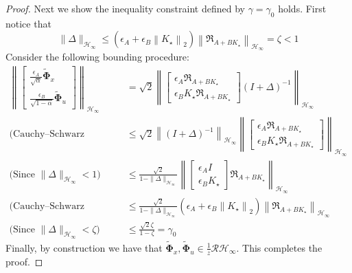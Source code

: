 \documentclass{article}[12pt]
\begin{document}
\begin{proof}
Next we show the inequality constraint defined by $\gamma = \gamma_0$ holds. First notice that
\begin{equation}
\label{pf::delta}
    \|\Delta\|_{\mathcal{H}_{\infty}} \leq\left(\epsilon_{A}+\epsilon_{B}\left\|K_{\star}\right\|_{2}\right)\left\|\mathfrak{R}_{A+B K_{\star}}\right\|_{\mathcal{H}_{\infty}}=\zeta<1
\end{equation}
Consider the following bounding procedure:
\begin{equation}
\begin{aligned}
    \left\|\left[\begin{array}{c}{\frac{\epsilon_{A}}{\sqrt{\alpha}} \tilde{\mathbf{\Phi}}_{x}} \\ {\frac{\epsilon_{B}}{\sqrt{1-\alpha}} \tilde{\mathbf{\Phi}}_{u}}\end{array}\right]\right\|_{\mathcal{H}_{\infty}} &= \sqrt{2}\left\|\left[\begin{array}{c}{\epsilon_{A} \Re_{A+B K_{\star}}} \\ {\epsilon_{B} K_{\star} \Re_{A+B K_{\star}}}\end{array}\right](I+\Delta)^{-1}\right\|_{\mathcal{H}_{\infty}} \\
    \text{(Cauchy–Schwarz Inequality)} \quad
    &\leq \sqrt{2}\left\|(I+\Delta)^{-1}\right\|_{\mathcal{H}_{\infty}}\left\|\left[\begin{array}{c}{\epsilon_{A} \Re_{A+B K_{\star}}} \\ {\epsilon_{B} K_{\star} \Re_{A+B K_{\star}}}\end{array}\right]\right\|_{\mathcal{H}_{\infty}} \\
    \text{(Since $\|\Delta\|_{\mathcal{H}_{\infty}}<1$)} \quad
    &\leq \frac{\sqrt{2}}{1-\|\Delta\|_{\mathcal{H}_{\infty}}}\left\|\left[\begin{array}{c}{\epsilon_{A} I} \\ {\epsilon_{B} K_{\star}}\end{array}\right] \mathfrak{R}_{A+B K_{\star}}\right\|_{\mathcal{H}_{\infty}} \\
    \text{(Cauchy–Schwarz Inequality)} \quad
    &\leq \frac{\sqrt{2}}{1-\|\Delta\|_{\mathcal{H}_{\infty}}}\left(\epsilon_{A}+\epsilon_{B}\left\|K_{\star}\right\|_{2}\right)\left\|\mathfrak{R}_{A+B K_{\star}}\right\|_{ \mathcal{H}_{\infty}} \\
    \text{(Since $\|\Delta\|_{\mathcal{H}_{\infty}}<\zeta$)} \quad
    &\leq \frac{\sqrt{2} \zeta}{1-\zeta} = \gamma_0
\end{aligned}
\end{equation}
Finally, by construction we have that $\tilde{\mathbf{\Phi}}_{x}, \tilde{\mathbf{\Phi}}_{u} \in \frac{1}{z} \mathcal{R} \mathcal{H}_{\infty}$. This completes the proof.
\end{proof}
\end{document}
